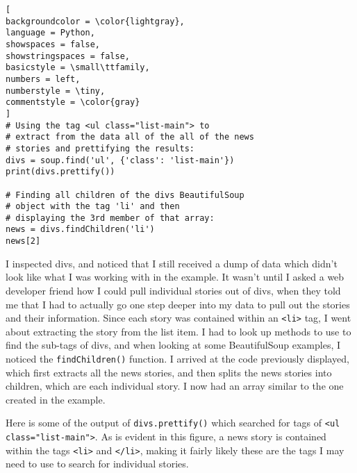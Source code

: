 \documentclass[]{article}
\newcommand{\code}[1]{\colorbox{light-gray}{\texttt{#1}}}
\begin{document}
\begin{lstlisting}[
backgroundcolor = \color{lightgray},
language = Python,
showspaces = false,
showstringspaces = false,
basicstyle = \small\ttfamily,
numbers = left,
numberstyle = \tiny,
commentstyle = \color{gray}
]
# Using the tag <ul class="list-main"> to 
# extract from the data all of the all of the news 
# stories and prettifying the results:
divs = soup.find('ul', {'class': 'list-main'})
print(divs.prettify())

# Finding all children of the divs BeautifulSoup
# object with the tag 'li' and then
# displaying the 3rd member of that array:
news = divs.findChildren('li')
news[2]
\end{lstlisting}
I inspected divs, and noticed that I still received a dump of data which didn't look like what I was working with in the example.  It wasn't until I asked a web developer friend how I could pull individual stories out of divs, when they told me that I had to actually go one step deeper into my data to pull out the stories and their information.  Since each story was contained within an \code{<li>} tag, I went about extracting the story from the list item.  I had to look up methods to use to find the sub-tags of divs, and when looking at some BeautifulSoup examples, I noticed the \code{findChildren()} function.  I arrived at the code previously displayed, which first extracts all the news stories, and then splits the news stories into children, which are each individual story.  I now had an array similar to the one created in the example.

Here is some of the output of \code{divs.prettify()} which searched for tags of \code{<ul class="list-main">}.  As is evident in this figure, a news story is contained within the tags \code{<li>} and \code{</li>}, making it fairly likely these are the tags I may need to use to search for individual stories.
\end{document}
